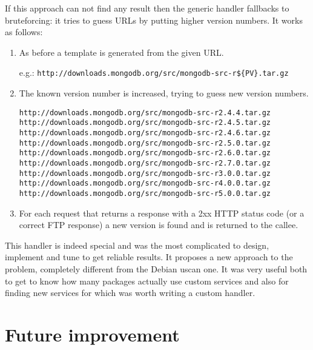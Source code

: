 If this approach can not find any result then the generic handler fallbacks to bruteforcing: it tries to guess URLs by putting higher version numbers. It works as follows:

\begin{enumerate}

\item As before a template is generated from the given URL.

e.g.: \texttt{http://downloads.mongodb.org/src/mongodb-src-r\$\{PV\}.tar.gz}

\item The known version number is increased, trying to guess new version numbers.

\texttt{http://downloads.mongodb.org/src/mongodb-src-r2.4.4.tar.gz} \\
\texttt{http://downloads.mongodb.org/src/mongodb-src-r2.4.5.tar.gz} \\
\texttt{http://downloads.mongodb.org/src/mongodb-src-r2.4.6.tar.gz} \\
\texttt{http://downloads.mongodb.org/src/mongodb-src-r2.5.0.tar.gz} \\
\texttt{http://downloads.mongodb.org/src/mongodb-src-r2.6.0.tar.gz} \\
\texttt{http://downloads.mongodb.org/src/mongodb-src-r2.7.0.tar.gz} \\
\texttt{http://downloads.mongodb.org/src/mongodb-src-r3.0.0.tar.gz} \\
\texttt{http://downloads.mongodb.org/src/mongodb-src-r4.0.0.tar.gz} \\
\texttt{http://downloads.mongodb.org/src/mongodb-src-r5.0.0.tar.gz} \\


\item For each request that returns a response with a 2xx HTTP status code (or a correct FTP response) a new version is found and is returned to the callee.
\end{enumerate}

This handler is indeed special and was the most complicated to design, implement and tune to get reliable results. It proposes a new approach to the problem, completely different from the Debian uscan one. It was very useful both to get to know how many packages actually use custom services and also for finding new services for which was worth writing a custom handler.


\section{Future improvement}

